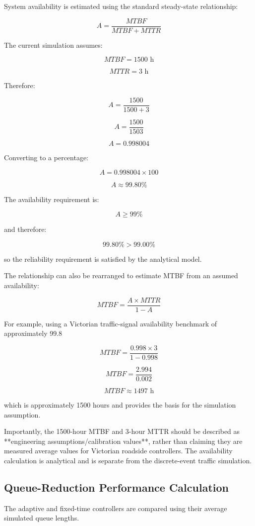\documentclass{article}
\begin{document}
System availability is estimated using the standard steady-state relationship:

$$
A=\frac{MTBF}{MTBF+MTTR}
$$

The current simulation assumes:

$$
MTBF=1500\text{ h}
$$

$$
MTTR=3\text{ h}
$$

Therefore:

$$
A=\frac{1500}{1500+3}
$$

$$
A=\frac{1500}{1503}
$$

$$
A=0.998004
$$

Converting to a percentage:

$$
A=0.998004\times100
$$

$$
\boxed{A\approx99.80\%}
$$

The availability requirement is:

$$
A\geq99\%
$$

and therefore:

$$
99.80\%>99.00\%
$$

so the reliability requirement is satisfied by the analytical model.

The relationship can also be rearranged to estimate MTBF from an assumed availability:

$$
MTBF=\frac{A\times MTTR}{1-A}
$$

For example, using a Victorian traffic-signal availability benchmark of approximately 99.8%

$$
MTBF=\frac{0.998\times3}{1-0.998}
$$

$$
MTBF=\frac{2.994}{0.002}
$$

$$
\boxed{MTBF\approx1497\text{ h}}
$$

which is approximately 1500 hours and provides the basis for the simulation assumption.

Importantly, the 1500-hour MTBF and 3-hour MTTR should be described as **engineering assumptions/calibration values**, rather than claiming they are measured average values for Victorian roadside controllers. The availability calculation is analytical and is separate from the discrete-event traffic simulation.

\subsection{Queue-Reduction Performance Calculation}

The adaptive and fixed-time controllers are compared using their average simulated queue lengths.
\end{document}
